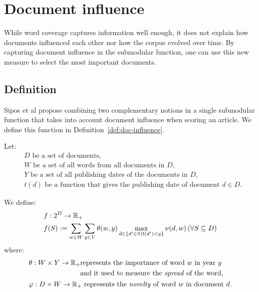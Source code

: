 \section{Document influence}
\label{sec:doc-influence}

While word coverage captures information well enough, it does not explain how
documents influenced each other nor how the corpus evolved over time. By
capturing document influence in the submodular function, one can use this new
measure to select the most important documents.

\subsection{Definition}

Sipos et al \cite{sipos2012temporal} propose combining two complementary
notions in a single submodular function that takes into account document
influence when scoring an article. We define this function in
Definition~\ref{def:doc-influence}.

Let:
\begin{align*}
  &D \text{ be a set of documents,} \\
  &W \text{ be a set of all words from all documents in \(D\),} \\
  &Y \text{ be a set of all publishing dates of the documents in \(D\),} \\
  &t(d) \text{ be a function that gives the publishing date of document \(d \in
  D\).}
\end{align*}

\begin{definition}
  \label{def:doc-influence}
  We define:
  \begin{align*}
    &f : 2^D \to \mathbb{R}_+ \\
    &f(S) := \sum_{w \in W} \sum_{y \in Y} \theta(w, y)
    \max_{d \in \{d' \in S | t(d') < y\}} \nu(d, w) \,(\forall S \subseteq D)
  \end{align*}
  where:
  \begin{align*}
    &\theta : W \times Y \to \mathbb{R}_+
    \begin{aligned}[t]
      &\text{represents the importance of word \(w\) in year \(y\)} \\
      &\text{and it used to measure the \emph{spread} of the word,}
    \end{aligned} \\
    &\varphi : D \times W \to \mathbb{R}_+ \text{ represents the \emph{novelty} of word
    \(w\) in document \(d\).}
  \end{align*}
\end{definition}

